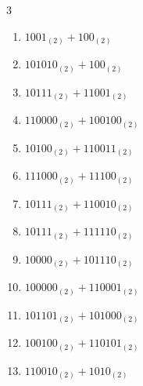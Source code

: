 \begin{multicols}{3}
\begin{enumerate}

  \item $1001_{(2)} + 100_{(2)}$


  \item $101010_{(2)} + 100_{(2)}$


  \item $10111_{(2)} + 11001_{(2)}$


  \item $110000_{(2)} + 100100_{(2)}$


  \item $10100_{(2)} + 110011_{(2)}$


  \item $111000_{(2)} + 11100_{(2)}$


  \item $10111_{(2)} + 110010_{(2)}$


\columnbreak %

\resetques

  \item $10111_{(2)} + 111110_{(2)}$


  \item $10000_{(2)} + 101110_{(2)}$


  \item $100000_{(2)} + 110001_{(2)}$


  \item $101101_{(2)} + 101000_{(2)}$


  \item $100100_{(2)} + 110101_{(2)}$


  \item $110010_{(2)} + 1010_{(2)}$


\end{enumerate}
\end{multicols}
